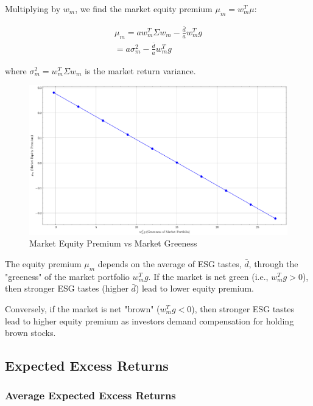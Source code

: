 Multiplying by $w_m$, we find the market equity premium $\mu_m = w_m^T \mu$:

\begin{equation}
    \begin{aligned}
    \mu_m = a w_m^T \Sigma w_m - \frac{\bar{d}}{a} w_m^T g  \\
    = a \sigma_m^2 - \frac{\bar{d}}{a} w_m^T g 
    \end{aligned}
\end{equation}

where $\sigma_m^2 = w_m^T \Sigma w_m$ is the market return variance. 

\begin{figure}
    \centering
    \includegraphics[width=1\textwidth]{../images/chapter02/market_equity_premium_vs_greenness.png}
    \caption{Market Equity Premium vs Market Greeness}
    \label{fig:equity_premium}
\end{figure}

The equity premium $\mu_m$ depends on the average of ESG tastes, $\bar{d}$,
through the "greeness" of the market portfolio $w_m^T g$.
If the market is net green (i.e., $w_m^T g > 0$), then stronger 
ESG tastes (higher $\bar{d}$) lead to lower equity premium.

Conversely, if the market is net "brown" ($w_m^T g < 0$), then stronger
ESG tastes lead to higher equity premium as investors demand 
compensation for holding brown stocks.


\subsection{Expected Excess Returns}

\subsubsection{Average Expected Excess Returns}

